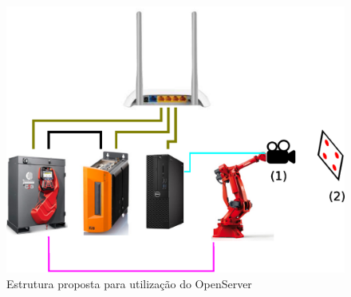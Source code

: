         \begin{figure}[ht]
            \centering
            \includegraphics[width=\columnwidth]{imagens/pespectiva.eps}
            \small 
            \centering 
            \caption{Estrutura proposta para utilização do OpenServer}
            \label{pespectiva}
        \end{figure}        
